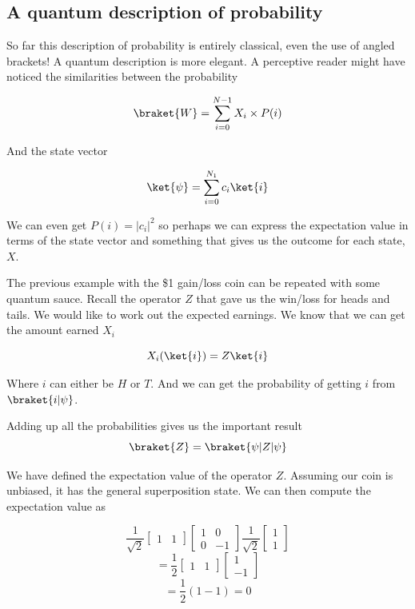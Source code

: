 \documentclass{book}
\begin{document}
\subsection{ A quantum description of probability }

So far this description of probability is entirely classical, even the use of angled brackets! A quantum description is more elegant. A perceptive reader might have noticed the similarities between the probability

$$ \braket{W} = \sum_{i = 0}^{N-1} X_i \times P(i) $$

And the state vector

$$
\ket{\psi} = \sum_{i = 0}^{N_1} c_i \ket{i}
$$ 

We can even get $P(i) = |c_i|^2$ so perhaps we can express the expectation value in terms of the state vector and something that gives us the outcome for each state,$X$. 

The previous example with the \$1 gain/loss coin can be repeated with some quantum sauce. Recall the operator $Z$ that gave us the win/loss for heads and tails. We would like to work out the expected earnings. We know that we can get the amount earned $X_i$

$$ X_i (\ket{i}) = Z\ket{i}$$

Where $i$ can either be $H$ or $T$. 
And we can get the probability of getting $i$ from $\braket{i|\psi}$.

Adding up all the probabilities gives us the important result
$$
\braket{Z} = \braket{\psi|Z|\psi}
$$

We have defined the expectation value of the operator $Z$. Assuming our coin is unbiased, it has the general superposition state. We can then compute the expectation value as

$$
\frac{1}{\sqrt{2}} \begin{bmatrix} 1 & 1 \end{bmatrix} \begin{bmatrix} 1 & 0 \\ 0 & -1 \end{bmatrix} \frac{1}{\sqrt{2}} \begin{bmatrix} 1 \\ 1 \end{bmatrix}
$$
$$
= \frac{1}{2}\begin{bmatrix} 1 & 1 \end{bmatrix} \begin{bmatrix} 1 \\ -1 \end{bmatrix}
$$
$$ = \frac{1}{2} ( 1 - 1) = 0 $$ 
\end{document}
